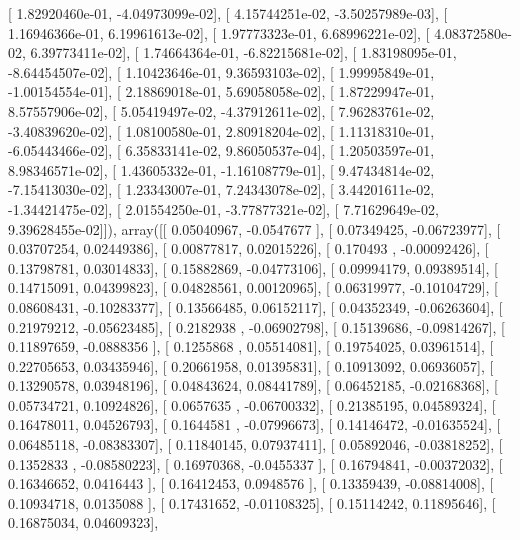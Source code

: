 \documentclass{article}
\begin{document}
       [  1.82920460e-01,  -4.04973099e-02],
       [  4.15744251e-02,  -3.50257989e-03],
       [  1.16946366e-01,   6.19961613e-02],
       [  1.97773323e-01,   6.68996221e-02],
       [  4.08372580e-02,   6.39773411e-02],
       [  1.74664364e-01,  -6.82215681e-02],
       [  1.83198095e-01,  -8.64454507e-02],
       [  1.10423646e-01,   9.36593103e-02],
       [  1.99995849e-01,  -1.00154554e-01],
       [  2.18869018e-01,   5.69058058e-02],
       [  1.87229947e-01,   8.57557906e-02],
       [  5.05419497e-02,  -4.37912611e-02],
       [  7.96283761e-02,  -3.40839620e-02],
       [  1.08100580e-01,   2.80918204e-02],
       [  1.11318310e-01,  -6.05443466e-02],
       [  6.35833141e-02,   9.86050537e-04],
       [  1.20503597e-01,   8.98346571e-02],
       [  1.43605332e-01,  -1.16108779e-01],
       [  9.47434814e-02,  -7.15413030e-02],
       [  1.23343007e-01,   7.24343078e-02],
       [  3.44201611e-02,  -1.34421475e-02],
       [  2.01554250e-01,  -3.77877321e-02],
       [  7.71629649e-02,   9.39628455e-02]]), array([[ 0.05040967, -0.0547677 ],
       [ 0.07349425, -0.06723977],
       [ 0.03707254,  0.02449386],
       [ 0.00877817,  0.02015226],
       [ 0.170493  , -0.00092426],
       [ 0.13798781,  0.03014833],
       [ 0.15882869, -0.04773106],
       [ 0.09994179,  0.09389514],
       [ 0.14715091,  0.04399823],
       [ 0.04828561,  0.00120965],
       [ 0.06319977, -0.10104729],
       [ 0.08608431, -0.10283377],
       [ 0.13566485,  0.06152117],
       [ 0.04352349, -0.06263604],
       [ 0.21979212, -0.05623485],
       [ 0.2182938 , -0.06902798],
       [ 0.15139686, -0.09814267],
       [ 0.11897659, -0.0888356 ],
       [ 0.1255868 ,  0.05514081],
       [ 0.19754025,  0.03961514],
       [ 0.22705653,  0.03435946],
       [ 0.20661958,  0.01395831],
       [ 0.10913092,  0.06936057],
       [ 0.13290578,  0.03948196],
       [ 0.04843624,  0.08441789],
       [ 0.06452185, -0.02168368],
       [ 0.05734721,  0.10924826],
       [ 0.0657635 , -0.06700332],
       [ 0.21385195,  0.04589324],
       [ 0.16478011,  0.04526793],
       [ 0.1644581 , -0.07996673],
       [ 0.14146472, -0.01635524],
       [ 0.06485118, -0.08383307],
       [ 0.11840145,  0.07937411],
       [ 0.05892046, -0.03818252],
       [ 0.1352833 , -0.08580223],
       [ 0.16970368, -0.0455337 ],
       [ 0.16794841, -0.00372032],
       [ 0.16346652,  0.0416443 ],
       [ 0.16412453,  0.0948576 ],
       [ 0.13359439, -0.08814008],
       [ 0.10934718,  0.0135088 ],
       [ 0.17431652, -0.01108325],
       [ 0.15114242,  0.11895646],
       [ 0.16875034,  0.04609323],
\end{document}
